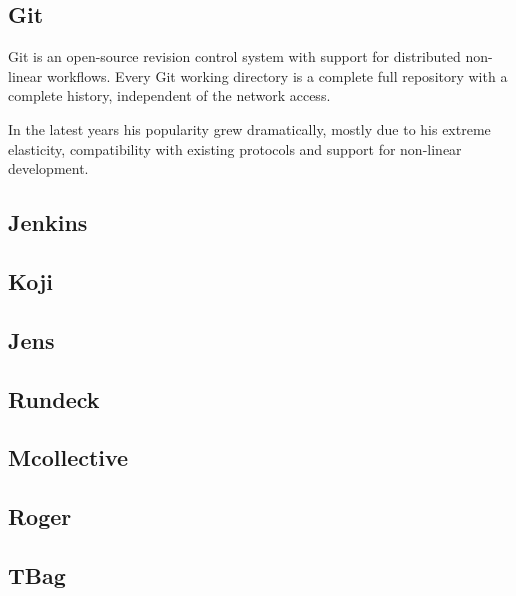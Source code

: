 \subsection{Git}

Git is an open-source revision control system with support for distributed
non-linear workflows. Every Git working directory is a complete full
repository with a complete history, independent of the network access.

In the latest years his popularity grew dramatically, mostly due to his
extreme elasticity, compatibility with existing protocols and support for
non-linear development.

\subsection{Jenkins}
\subsection{Koji}
\subsection{Jens}
\subsection{Rundeck}
\subsection{Mcollective}
\subsection{Roger}
\subsection{TBag}

